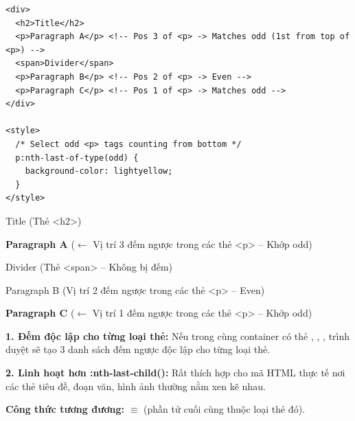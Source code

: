 \begin{codeWindow}
\begin{lstlisting}[language=HTML5]
<div>
  <h2>Title</h2>
  <p>Paragraph A</p> <!-- Pos 3 of <p> -> Matches odd (1st from top of <p>) -->
  <span>Divider</span>
  <p>Paragraph B</p> <!-- Pos 2 of <p> -> Even -->
  <p>Paragraph C</p> <!-- Pos 1 of <p> -> Matches odd -->
</div>

<style>
  /* Select odd <p> tags counting from bottom */
  p:nth-last-of-type(odd) {
    background-color: lightyellow;
  }
</style>
\end{lstlisting}
\end{codeWindow}

\begin{browserWindow}
\sffamily\small
Title {\scriptsize\textcolor{gray!60}{(Thẻ <h2>)}} \par\vspace{2pt}
\colorbox{yellow!20}{\textbf{Paragraph A}} {\scriptsize\textcolor{gray!60}{($\leftarrow$ Vị trí 3 đếm ngược trong các thẻ <p> -- Khớp odd)}} \par\vspace{2pt}
Divider {\scriptsize\textcolor{gray!60}{(Thẻ <span> -- Không bị đếm)}} \par\vspace{2pt}
Paragraph B {\scriptsize\textcolor{gray!60}{(Vị trí 2 đếm ngược trong các thẻ <p> -- Even)}} \par\vspace{2pt}
\colorbox{yellow!20}{\textbf{Paragraph C}} {\scriptsize\textcolor{gray!60}{($\leftarrow$ Vị trí 1 đếm ngược trong các thẻ <p> -- Khớp odd)}}
\end{browserWindow}

\begin{warnBox}
\textbf{1. Đếm độc lập cho từng loại thẻ:} Nếu trong cùng container có thẻ , , , trình duyệt sẽ tạo 3 danh sách đếm ngược độc lập cho từng loại thẻ.
\par\vspace{4pt}
\textbf{2. Linh hoạt hơn :nth-last-child():} Rất thích hợp cho mã HTML thực tế nơi các thẻ tiêu đề, đoạn văn, hình ảnh thường nằm xen kẽ nhau.
\end{warnBox}

\begin{tipBox}
\textbf{Công thức tương đương:}  $\equiv$  (phần tử cuối cùng thuộc loại thẻ đó).
\end{tipBox}

